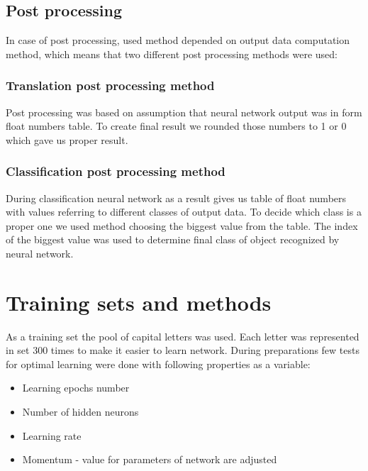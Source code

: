 \documentclass[a4paper]{article}
\begin{document}
\subsection{Post processing}
In case of post processing, used method depended on output data computation method, which means that two different post processing methods were used:
\subsubsection{Translation post processing method}
Post processing was based on assumption that neural network output was in form float numbers table.
To create final result we rounded those numbers to 1 or 0 which gave us proper result.
\subsubsection{Classification post processing method}
During classification neural network as a result gives us table of float numbers with values referring to different classes of output data.
To decide which class is a proper one we used method choosing the biggest value from the table. The index of the biggest value was used to determine final class of object recognized by neural network. 

\section{Training sets and methods}
As a training set the pool of capital letters was used. Each letter was represented in set 300 times to make it easier to learn network. During preparations few tests for optimal learning were done with following properties as a variable:
\begin{itemize}
	\item Learning epochs number
	\item Number of hidden neurons
	\item Learning rate
	\item Momentum - value for parameters of network are adjusted
\end{itemize}
\end{document}
